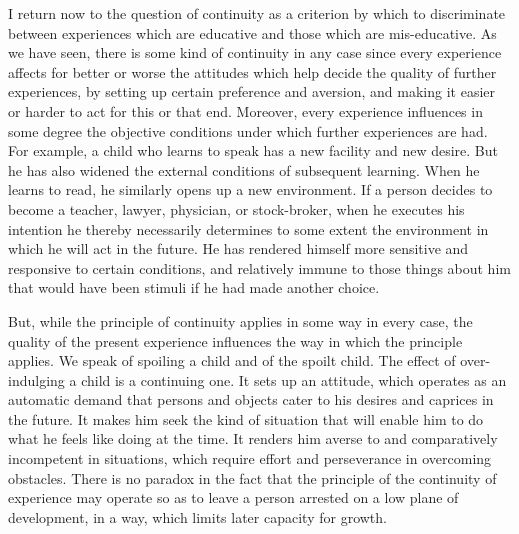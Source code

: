 I return now to the question of continuity as a criterion by which to discriminate 
between experiences which are educative and those which are mis-educative. As we have 
seen, there is some kind of continuity in any case since every experience affects for better or worse the attitudes which help decide the quality of further experiences, by setting up 
certain preference and aversion, and making it easier or harder to act for this or that end. 
Moreover, every experience influences in some degree the objective conditions under 
which further experiences are had. For example, a child who learns to speak has a new 
facility and new desire. But he has also widened the external conditions of subsequent 
learning. When he learns to read, he similarly opens up a new environment. If a person 
decides to become a teacher, lawyer, physician, or stock-broker, when he executes his 
intention he thereby necessarily determines to some extent the environment in which he 
will act in the future. He has rendered himself more sensitive and responsive to certain 
conditions, and relatively immune to those things about him that would have been stimuli 
if he had made another choice. 

But, while the principle of continuity applies in some way in every case, the quality of 
the present experience influences the way in which the principle applies. We speak of 
spoiling a child and of the spoilt child. The effect of over-indulging a child is a 
continuing one. It sets up an attitude, which operates as an automatic demand that persons 
and objects cater to his desires and caprices in the future. It makes him seek the kind of 
situation that will enable him to do what he feels like doing at the time. It renders him 
averse to and comparatively incompetent in situations, which require effort and 
perseverance in overcoming obstacles. There is no paradox in the fact that the principle 
of the continuity of experience may operate so as to leave a person arrested on a low 
plane of development, in a way, which limits later capacity for growth. 

